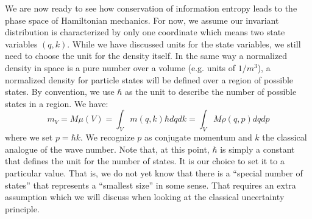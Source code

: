 \documentclass[11pt]{elsarticle}
\begin{document}
We are now ready to see how conservation of information entropy leads to the phase space of Hamiltonian mechanics. For now, we assume our invariant distribution is characterized by only one coordinate which means two state variables $(q, k)$. While we have discussed units for the state variables, we still need to choose the unit for the density itself. In the same way a normalized density in space is a pure number over a volume (e.g. units of $1/m^3$), a normalized density for particle states will be defined over a region of possible states. By convention, we use $\hbar$ as the unit to describe the number of possible states in a region. We have:
\begin{equation}
m_V = M \mu(V) =\int_V m(q, k) \hbar dq dk = \int_V M \rho(q, p) dq dp
\end{equation}
where we set $p=\hbar k$. We recognize $p$ as conjugate momentum and $k$ the classical analogue of the wave number. Note that, at this point, $\hbar$ is simply a constant that defines the unit for the number of states. It is our choice to set it to a particular value. That is, we do not yet know that there is a ``special number of states'' that represents a ``smallest size'' in some sense. That requires an extra assumption which we will discuss when looking at the classical uncertainty principle.
\end{document}
